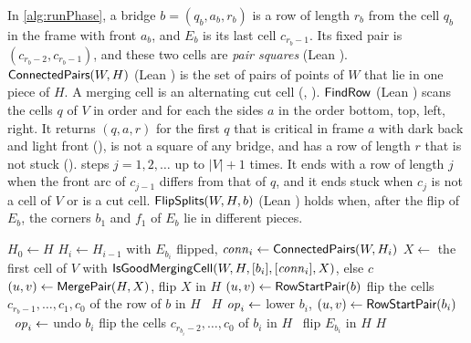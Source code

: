 In \cref{alg:runPhase}, a bridge $b=(q_b,a_b,r_b)$ is a row of length $r_b$ from the cell $q_b$ in
the frame with front $a_b$, and $E_b$ is its last cell $c_{r_b-1}$.
Its fixed pair is $(c_{r_b-2},c_{r_b-1})$, and these two cells are \emph{pair squares} (Lean
).
$\textsf{ConnectedPairs}(W,H)$ (Lean ) is the set of pairs of points of $W$ that lie in one
piece of $H$.
A merging cell is an alternating cut cell (, ).
$\textsf{FindRow}$ (Lean ) scans the cells $q$ of $V$ in order and for each the sides
$a$ in the order bottom, top, left, right.
It returns $(q,a,r)$ for the first $q$ that is critical in frame $a$ with dark back and light front
(), is not a square of any bridge, and has a row of length $r$ that is not stuck
().
 steps $j=1,2,\dots$ up to $|V|+1$ times.
It ends with a row of length $j$ when the front arc of $c_{j-1}$ differs from that of $q$, and it
ends stuck when $c_j$ is not a cell of $V$ or is a cut cell.
$\textsf{FlipSplits}(W,H,b)$ (Lean ) holds when, after the flip of $E_b$, the corners
$b_1$ and $f_1$ of $E_b$ lie in different pieces.

\begin{algorithm}[htbp]
\caption{ (Lean ) and
   (Lean  and )}
\label{alg:reducePieces}
\begin{algorithmic}[1]
  \State $H_0\gets H$
    \State $H_i\gets H_{i-1}$ with $E_{b_i}$ flipped, \quad $\mathit{conn}_i\gets\textsf{ConnectedPairs}(W,H_i)$
  \EndFor
    \State $X\gets$ the first cell of $V$ with
      $\textsf{IsGoodMergingCell}(W,H,[b_i],[\mathit{conn}_i],X)$, else $c$
    \State $(u,v)\gets\textsf{MergePair}(H,X)$, \quad flip $X$ in $H$
    \State $(u,v)\gets\textsf{RowStartPair}(b)$
    \State flip the cells $c_{r_b-1},\dots,c_1,c_0$ of the row of $b$ in $H$
  \Else\ \Return $H$
  \EndIf
  \State \Return {}
\EndFunction
\Statex
{}
      \State $\mathit{op}_i\gets$ lower $b_i$, \quad $(u,v)\gets\textsf{RowStartPair}(b_i)$
    \Else\ $\mathit{op}_i\gets$ undo $b_i$
    \EndIf
  \EndFor
     flip the cells $c_{r_{b_i}-2},\dots,c_0$ of $b_i$ in $H$
    \Else\ flip $E_{b_i}$ in $H$
    \EndIf
  \EndFor
  \State \Return $H$
\EndFunction
\end{algorithmic}
\end{algorithm}

